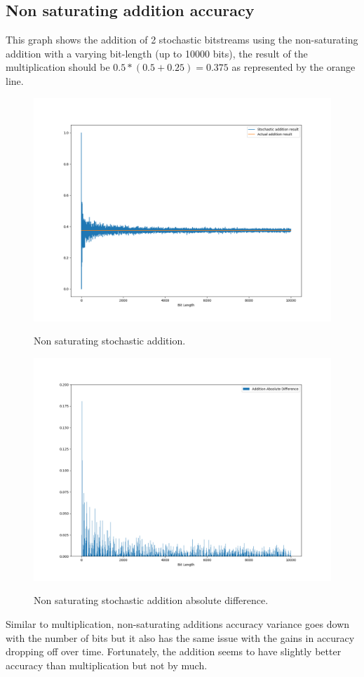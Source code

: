 \documentclass[a4paper,oneside,phd,etd]{BYUPhys}
\begin{document}
\subsection{Non saturating addition accuracy}
This graph shows the addition of 2 stochastic bitstreams using the non-saturating addition with a varying bit-length (up to 10000 bits), the result of the multiplication should be $0.5*(0.5+0.25)=0.375$ as represented by the orange line.

\begin{figure}[H]
\centering
\includegraphics[scale=0.4]{results/Figure_2.png}
\label{fig:no_sat}
\caption{Non saturating stochastic addition.}
\end{figure}
\begin{figure}[H]
\centering
\includegraphics[scale=0.4]{results/Figure_2-abs.png}
\label{fig:abs_no_sat}
\caption{Non saturating stochastic addition absolute difference.}
\end{figure}
Similar to multiplication, non-saturating additions accuracy variance goes down with the number of bits but it also has the same issue with the gains in accuracy dropping off over time. Fortunately, the addition seems to have slightly better accuracy than multiplication but not by much.
\end{document}
